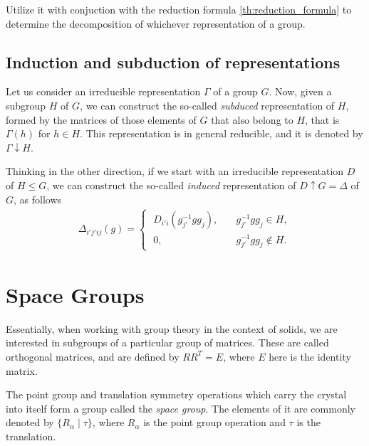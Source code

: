 Utilize it with conjuction with the reduction formula \ref{th:reduction_formula} to determine the decomposition of whichever representation of a group.

\subsection{Induction and subduction of representations}

Let us consider an irreducible representation $\Gamma$ of a group $G$. Now, given a subgroup $H$ of $G$, we can construct the so-called \textit{subduced} representation of $H$, formed by the matrices of those elements of $G$ that also belong to $H$, that is $\Gamma(h)$ for $h \in H$. This representation is in general reducible, and it is denoted by $\Gamma \downarrow H$.

Thinking in the other direction, if we start with an irreducible representation $D$ of $H \leq G$, we can construct the so-called \textit{induced} representation of $D \uparrow G = \Delta$ of $G$, as follows
\begin{align*}
\Delta_{i'j'ij}(g) =
\begin{cases}
\; D_{i'i}(g_{j'}^{-1} g g_j), \quad & g_{j'}^{-1} g g_j \in H, \\
\; 0,  & g_{j'}^{-1} g g_j \notin H.
\end{cases}
\end{align*}


\section{Space Groups}


Essentially, when working with group theory in the context of solids, we are interested in subgroups of a particular group of matrices. These are called orthogonal matrices, and are defined by $R R^T = E$, where $E$ here is the identity matrix.

\n

The point group and translation symmetry operations which carry the crystal into itself form a group called the \textit{space group}. The elements of it are commonly denoted by  $\{ R_\alpha \mid \tau \} $, where $R_\alpha$ is the point group operation and $\tau$ is the translation.

